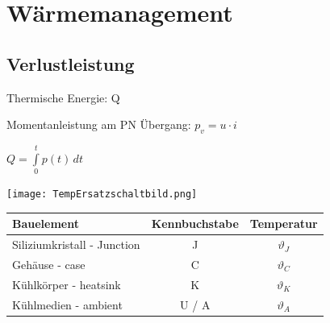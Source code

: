 \documentclass[german]{latex4ei/latex4ei_sheet}
\begin{document}
\section{Wärmemanagement}
	\begin{sectionbox}
		\subsection{Verlustleistung}
			\begin{bluebox}
				\item Thermische Energie: Q
				\item Momentanleistung am PN Übergang: $p_v = u \cdot i$
				\item $Q = \int\limits_0^t p(t)\,dt$
				\item \texttt{[image: TempErsatzschaltbild.png]}
			\end{bluebox}
			\begin{tabular}{|l|c|c|}
				\textbf{Bauelement}	& \textbf{Kennbuchstabe} & \textbf{Temperatur}\\
				\hline
				Siliziumkristall - Junction & J & $\vartheta_J$\\
				Gehäuse - case & C & $\vartheta_C$\\
				Kühlkörper - heatsink & K & $\vartheta_K$\\
				Kühlmedien - ambient & U / A & $\vartheta_A$
				
			\end{tabular}
	\end{sectionbox}
\end{document}
